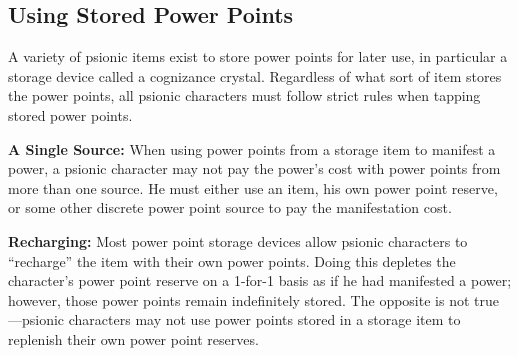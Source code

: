 \subsection{Using Stored Power Points}
A variety of psionic items exist to store power points for later use, in particular a storage device called a cognizance crystal. Regardless of what sort of item stores the power points, all psionic characters must follow strict rules when tapping stored power points.

\textbf{A Single Source:} When using power points from a storage item to manifest a power, a psionic character may not pay the power's cost with power points from more than one source. He must either use an item, his own power point reserve, or some other discrete power point source to pay the manifestation cost.

\textbf{Recharging:} Most power point storage devices allow psionic characters to ``recharge'' the item with their own power points. Doing this depletes the character's power point reserve on a 1-for-1 basis as if he had manifested a power; however, those power points remain indefinitely stored. The opposite is not true---psionic characters may not use power points stored in a storage item to replenish their own power point reserves.


